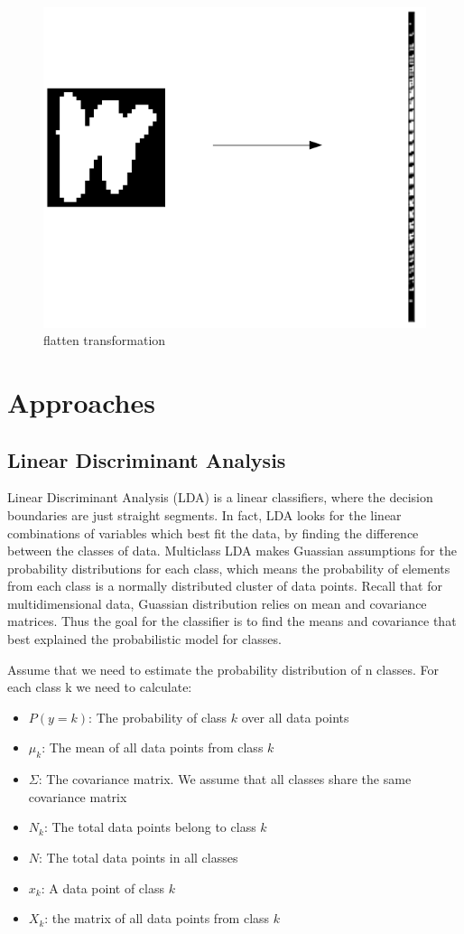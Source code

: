 \documentclass[12,]{article}
\providecommand{\tightlist}{%
  \setlength{\itemsep}{0pt}\setlength{\parskip}{0pt}}
\begin{document}
\begin{figure}[h]
  \begin{center}
  \includegraphics[width=0.4\columnwidth]{./flatten-transform.png}
  \end{center}
  \caption{flatten transformation}
\end{figure}

\hypertarget{approaches}{%
\section{Approaches}\label{approaches}}

\hypertarget{linear-discriminant-analysis}{%
\subsection{Linear Discriminant
Analysis}\label{linear-discriminant-analysis}}

Linear Discriminant Analysis (LDA) \cite{lda} is a linear classifiers,
where the decision boundaries are just straight segments. In fact, LDA
looks for the linear combinations of variables which best fit the data,
by finding the difference between the classes of data. Multiclass LDA
makes Guassian assumptions for the probability distributions for each
class, which means the probability of elements from each class is a
normally distributed cluster of data points. Recall that for
multidimensional data, Guassian distribution relies on mean and
covariance matrices. Thus the goal for the classifier is to find the
means and covariance that best explained the probabilistic model for
classes.

Assume that we need to estimate the probability distribution of n
classes. For each class k we need to calculate:

\begin{itemize}
\tightlist
\item
  \(P(y=k)\): The probability of class \(k\) over all data points
\item
  \(\mu_k\): The mean of all data points from class \(k\)
\item
  \(\Sigma\): The covariance matrix. We assume that all classes share
  the same covariance matrix
\item
  \(N_k\): The total data points belong to class \(k\)
\item
  \(N\): The total data points in all classes
\item
  \(x_k\): A data point of class \(k\)
\item
  \(X_k\): the matrix of all data points from class \(k\)
\end{itemize}
\end{document}
